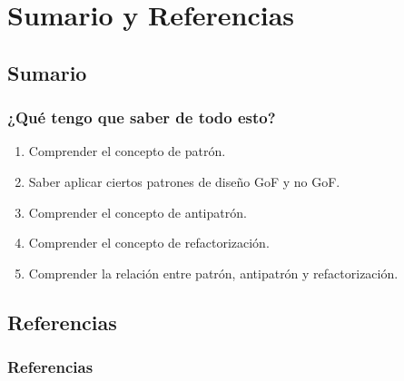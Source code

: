 ﻿\documentclass[animated,a4paper,slidestop,xcolor=pst,blue]{beamer}
\begin{document}
%
%

\section{Sumario y Referencias}

\subsection{Sumario}

\begin{frame}[c]
	\frametitle{¿Qué tengo que saber de todo esto?}
	\begin{enumerate}[<+->]
		\item Comprender el concepto de patrón.
		\item \alert{Saber aplicar ciertos patrones de diseño GoF y no GoF}.
		\item Comprender el concepto de antipatrón.
		\item Comprender el concepto de refactorización.
        \item Comprender la relación entre patrón, antipatrón y refactorización.
	\end{enumerate}
\end{frame}

\subsection{Referencias}

\begin{frame}[c]
	\frametitle{Referencias}
	
	
\end{frame}
\end{document}
